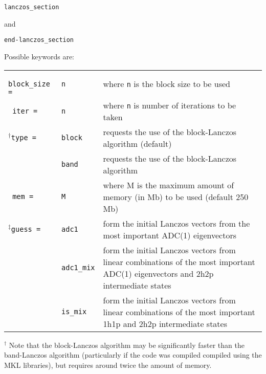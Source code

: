 \documentclass[12pt]{article}
\newcommand*\code[1]{\mbox{\texttt{{#1}}}} %
\begin{document}
\vspace{0.2cm}
\code{lanczos\_section}

\vspace{0.2cm}
\noindent
and

\vspace{0.2cm}
\code{end-lanczos\_section}

\vspace{0.2cm}
\noindent
Possible keywords are:

\begin{table}[h]
\vspace*{1.7ex}
\begin{center}
\begin{tabular}{llp{2.5in}}
\code{ block\_size =} & \code{n} & where \code{n} is the block size to be used \\
\vspace{0.2cm}
\code{ iter =} & \code{n} & where \code{n} is number of iterations to be taken \\
\vspace{0.2cm}
$^{\dagger}$\code{type =} & \code{block} & requests the use of the block-Lanczos algorithm (default) \\
              & \code{band} & requests the use of the block-Lanczos algorithm \\
\vspace{0.2cm}
\code{ mem =} & \code{M} & where M is the maximum amount of memory (in Mb) to be used (default 250 Mb) \\
\vspace{0.2cm}
$^{\ddagger}$\code{guess =} & \code{adc1} & form the initial Lanczos vectors from the most important ADC(1) eigenvectors \\
               & \code{adc1\_mix} & form the initial Lanczos vectors from linear combinations of the most important ADC(1) eigenvectors and 2h2p intermediate states\\
               & \code{is\_mix} & form the initial Lanczos vectors from linear combinations of the most important 1h1p and 2h2p intermediate states \\
\end{tabular}
\end{center}
\end{table}

\vspace{0.2cm}
\noindent
$^{\dagger}$ Note that the block-Lanczos algorithm may be
significantly faster than the band-Lanczos algorithm (particularly if
the code was compiled compiled using the MKL libraries), but requires
around twice the amount of memory.
\end{document}
